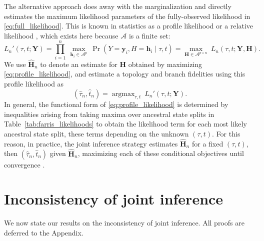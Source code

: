\documentclass[11pt]{article}
\newcommand{\alphabet}{\mathcal{A}}
\newcommand{\fullAlignment}{\mathbf{Y}}
\newcommand{\alignmentColumn}{\mathbf{y}}
\newcommand{\alignmentColumnRV}{Y}
\newcommand{\fullAncestralStates}{\mathbf{H}}
\newcommand{\ancestralStateColumn}{\mathbf{h}}
\newcommand{\ancestralStateColumnRV}{H}
\newcommand{\nCols}{n}
\newcommand{\nAncestralStateRows}{p}
\DeclareMathOperator*{\argmax}{argmax}
\begin{document}
The alternative approach \citep{Sagulenko2018-xl} does away with the marginalization and directly estimates the maximum likelihood parameters of the fully-observed likelihood in \eqref{eq:full_likelihood}.
This is known in statistics as a profile likelihood \citep{Murphy2000-ry} or a relative likelihood \citep{Goldman1990-dk}, which exists here because $\alphabet$ is a finite set:
\begin{equation}
\label{eq:profile_likelihood}
L_\nCols'(\tau, t; \fullAlignment) = \prod_{i=1}^{\nCols} \ \max_{\ancestralStateColumn_i\in\alphabet^{\nAncestralStateRows}} \ \Pr(\alignmentColumnRV=\alignmentColumn_i, \ancestralStateColumnRV=\ancestralStateColumn_i \mid \tau, t) = \max_{\fullAncestralStates\in\alphabet^{\nAncestralStateRows\times\nCols}} \ L_\nCols(\tau, t; \fullAlignment, \fullAncestralStates).
\end{equation}
We use $\hat{\fullAncestralStates}_\nCols$ to denote an estimate for $\fullAncestralStates$ obtained by maximizing \eqref{eq:profile_likelihood}, and estimate a topology and branch fidelities using this profile likelihood as
\begin{equation}
\label{eq:profile_likelihood_topology_bl}
(\hat{\tau}_\nCols, \hat{t}_\nCols) = \argmax_{\tau, t} \ L_\nCols'(\tau, t; \fullAlignment).
\end{equation}
In general, the functional form of \eqref{eq:profile_likelihood} is determined by inequalities arising from taking maxima over ancestral state splits in Table~\ref{tab:farris_likelihoods} to obtain the likelihood term for each most likely ancestral state split, these terms depending on the unknown $(\tau, t)$.
For this reason, in practice, the joint inference strategy estimates $\hat{\fullAncestralStates}_\nCols$ for a fixed $(\tau,t)$, then $(\hat{\tau}_\nCols,\hat{t}_\nCols)$ given $\hat{\fullAncestralStates}_\nCols$, maximizing each of these conditional objectives until convergence \citep{Sagulenko2018-xl}.


\section*{Inconsistency of joint inference}

We now state our results on the inconsistency of joint inference.
All proofs are deferred to the Appendix.
\end{document}

